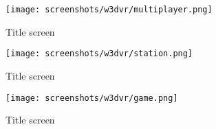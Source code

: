 \begin{figure}[H]
  \centering
 \texttt{[image: screenshots/w3dvr/multiplayer.png]}
 \caption{Title screen}
\end{figure}

\begin{figure}[H]
  \centering
 \texttt{[image: screenshots/w3dvr/station.png]}
 \caption{Title screen}
\end{figure}

\begin{figure}[H]
  \centering
 \texttt{[image: screenshots/w3dvr/game.png]}
 \caption{Title screen}
\end{figure}


